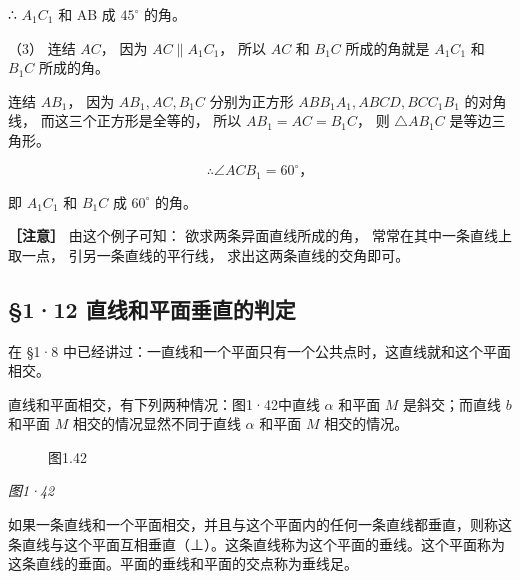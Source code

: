 ∴ \(A_{1}C_{1}\) 和 AB 成 \(45^{\circ}\) 的角。

（3） 连结 \(AC\)， 因为 \(AC \parallel A_{1}C_{1}\)， 所以 \(AC\) 和
\(B_{1}C\) 所成的角就是 \(A_{1}C_{1}\) 和 \(B_{1}C\) 所成的角。

连结 \(AB_{1}\)， 因为 \(AB_{1}, AC, B_{1}C\) 分别为正方形
\(ABB_{1}A_{1}, ABCD, BCC_{1}B_{1}\) 的对角线， 而这三个正方形是全等的，
所以 \(AB_{1} = AC = B_{1}C\)， 则 \(\triangle AB_{1}C\) 是等边三角形。

\[
\therefore \angle A C B _ {1} = 60^{\circ}\text{，}
\]

即 \(A_{1}C_{1}\) 和 \(B_{1}C\) 成 \(60^{\circ}\) 的角。

\textbf{［注意］} 由这个例子可知： 欲求两条异面直线所成的角，
常常在其中一条直线上取一点， 引另一条直线的平行线，
求出这两条直线的交角即可。

\subsection{§1·12
直线和平面垂直的判定}

在 §1·8
中已经讲过：一直线和一个平面只有一个公共点时，这直线就和这个平面相交。

直线和平面相交，有下列两种情况：图1·42中直线 \(\alpha\) 和平面 \(M\)
是斜交；而直线 \(b\) 和平面 \(M\) 相交的情况显然不同于直线 \(\alpha\)
和平面 \(M\) 相交的情况。

\begin{figure}
\centering
{}
\caption{图1.42}
\end{figure}

\emph{图1·42}

如果一条直线和一个平面相交，并且与这个平面内的任何一条直线都垂直，则称这条直线与这个平面互相垂直（⊥）。这条直线称为这个平面的垂线。这个平面称为这条直线的垂面。平面的垂线和平面的交点称为垂线足。

